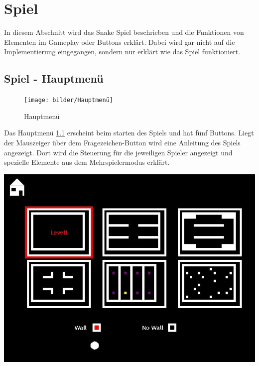 \chapter{Spiel}
\label{Spiel}
%
In diesem Abschnitt wird das Snake Spiel beschrieben und die Funktionen von Elementen im Gameplay oder Buttons erkl{\"a}rt. Dabei wird gar nicht auf die Implementierung eingegangen, sondern nur erkl{\"a}rt wie das Spiel funktioniert.


\section{Spiel - Hauptmen{\"u}}
\label{Spiel_-_Hauptmenü}
%
\begin{figure}[h]
 \centering
 \texttt{[image: bilder/Hauptmenü]}
 \caption{Hauptmen{\"u}}
 \label{fig:hauptmenü}
\end{figure}
Das Hauptmen{\"u} \ref{fig:hauptmenü} erscheint beim starten des Spiels und hat f{\"u}nf Buttons. Liegt der Mauszeiger {\"u}ber dem Fragezeichen-Button wird eine Anleitung des Spiels angezeigt. Dort wird die Steuerung f{\"u}r die jeweiligen Spieler angezeigt und spezielle Elemente aus dem Mehrspielermodus erkl{\"a}rt.\\
\begin{minipage}[X]{1.1\textwidth}
 \centering
 \includegraphics[scale=0.5]{bilder/Einstellungen}
 \label{fig:einstellungen}
\end{minipage}
